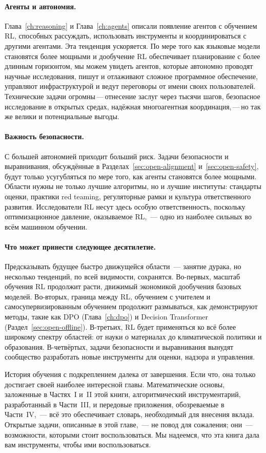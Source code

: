 \paragraph{Агенты и автономия.}
Глава~\ref{ch:reasoning} и Глава~\ref{ch:agents} описали
появление агентов с обучением RL, способных рассуждать, использовать инструменты и
координироваться с другими агентами. Эта тенденция ускоряется. По мере того как
языковые модели становятся более мощными и дообучение RL обеспечивает
планирование с более длинным горизонтом, мы можем увидеть агентов, которые автономно проводят
научные исследования, пишут и отлаживают сложное программное обеспечение, управляют
инфраструктурой и ведут переговоры от имени своих пользователей. Технические
задачи огромны\,---\,отнесение заслуг через
тысячи шагов, безопасное исследование в открытых средах,
надёжная многоагентная координация,\,---\,но так же велики и потенциальные
выгоды.

\paragraph{Важность безопасности.}
С большей автономией приходит больший риск. Задачи безопасности и выравнивания,
обсуждённые в Разделах~\ref{sec:open-alignment}
и~\ref{sec:open-safety}, будут только усугубляться по мере того, как агенты
становятся более мощными. Области нужны не только лучшие алгоритмы, но и
лучшие институты: стандарты оценки, практики red teaming,
регуляторные рамки и культура ответственного
развития. Исследователи RL несут здесь особую ответственность, поскольку
оптимизационное давление, оказываемое RL,~--- одно из наиболее сильных во
всём машинном обучении.

\paragraph{Что может принести следующее десятилетие.}
Предсказывать будущее быстро движущейся области~--- занятие дурака,
но несколько тенденций, по всей видимости, сохранятся. Во-первых, масштаб
обучения RL продолжит расти, движимый экономикой
дообучения базовых моделей. Во-вторых, граница между RL,
обучением с учителем и самосупервизированным обучением продолжит
размываться, как демонстрируют методы, такие как DPO (Глава~\ref{ch:dpo}) и Decision
Transformer (Раздел~\ref{sec:open-offline}). В-третьих, RL
будет применяться ко всё более широкому спектру областей: от науки о
материалах до климатической политики и образования. В-четвёртых, задачи
безопасности и выравнивания вынудят сообщество разработать новые инструменты для
оценки, надзора и управления.

История обучения с подкреплением далека от завершения. Если что, она
только достигает своей наиболее интересной главы. Математические
основы, заложенные в Частях~I и~II этой книги, алгоритмический
инструментарий, разработанный в Части~III, и передовые приложения, обозреваемые
в Части~IV,~--- всё это обеспечивает словарь, необходимый для внесения вклада. Открытые
задачи, описанные в этой главе,~--- не повод для сожаления;
они~--- возможности, которыми стоит воспользоваться. Мы надеемся, что эта книга дала вам
инструменты, чтобы ими воспользоваться.

